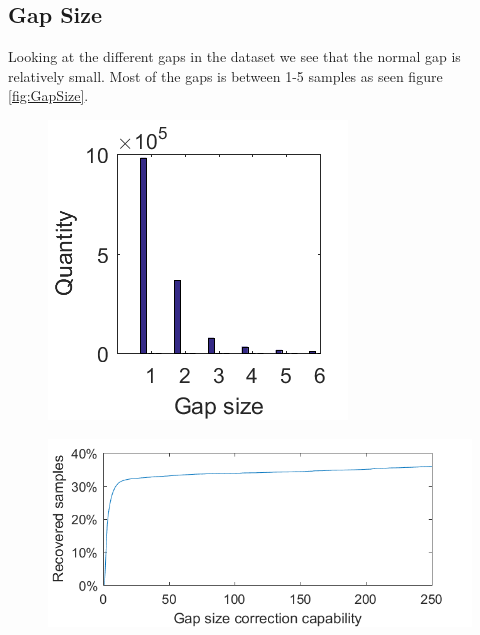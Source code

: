 \subsection{Gap Size}
Looking at the different gaps in the dataset we see that the normal gap is relatively small. Most of the gaps is between 1-5 samples as seen figure \ref{fig:GapSize}.

\begin{figure}[H]
\centering
\begin{minipage}{.3\textwidth}
  \centering
  \includegraphics[width=1\linewidth]{billeder/GapInfo1.png}
  \label{fig:GapSize}
\end{minipage}%
\begin{minipage}{.8\textwidth}
  \centering
  \includegraphics[width=0.8\linewidth]{billeder/CorrectionCapability.png}
  \label{fig:GapCorrect}
\end{minipage}
\end{figure}

